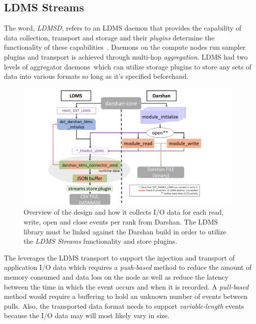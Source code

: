 \subsection{LDMS Streams}
The word, \emph{LDMSD}, refers to an LDMS daemon that provides the capability of data collection, transport and storage and their \emph{plugins} determine the functionality of these capabilities~\cite{ldmsgithubwiki}. Daemons on the compute nodes run sampler plugins and transport is achieved through multi-hop \emph{aggregation}. LDMS had two levels of aggregator daemons~\cite{ldmsgithubwiki}which can utilize storage plugins to store any sets of data into various formats so long as it's specified beforehand.

\begin{figure}
	\centering
	\includegraphics[trim={3.5cm 0 0 0},clip,
	width=1.15\linewidth]{figs/darshan-connector.pdf}
	\caption{Overview of the \connector{} design and how it collects I/O data for each read, write, open and close events per rank from Darshan. The LDMS library must be linked against the Darshan build in order to utilize the \emph{LDMS Streams} functionality and store plugins.}
	\label{f:Darshan Connector}
\end{figure}

The \Darshan{} leverages the LDMS transport to support the injection and transport of application I/O data which requires a \emph{push-based} method to reduce the amount of memory consumed and data loss on the node as well as reduce the latency between the time in which the event occurs and when it is recorded. A \emph{pull-based} method would require a buffering to hold an unknown number of events between pulls. Also, the transported data format needs to support  \emph{variable-length} events because the I/O data may will most likely vary in size. 

